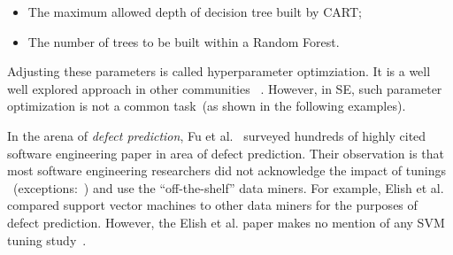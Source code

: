 \documentclass[sigconf,review, anonymous]{acmart}
\theoremstyle{break}
\newcommand{\bi}{\begin{itemize}[leftmargin=0.4cm]}
\newcommand{\ei}{\end{itemize}}
\begin{document}
\begin{table}[htp]
   \caption {List of Parameters Tuned by This Paper.}
\centering
{}
\label{tab:parameters}
\end{table}


\bi
\item
The maximum allowed depth
of decision tree built by CART;
\item
The number of trees to be built within a Random Forest.
\ei



Adjusting these parameters
is called hyperparameter optimziation.
It is a well   well explored approach in other communities ~\cite{bergstra2012random,li2016hyperband}. However, in SE,
such parameter optimization is not a common task~(as shown in the following examples).





In the arena of {\em defect prediction}, 
Fu et al.~\cite{fu2016tuning}  surveyed hundreds of highly 
cited software engineering paper in area of defect prediction. 
Their observation is that most software engineering  researchers
did not acknowledge the impact of tunings 
~(exceptions:~\cite{lessmann2008benchmarking,tantithamthavorn2016automated}) and
use the ``off-the-shelf'' data miners. For example, 
Elish et al.~\cite{elish2008predicting} compared support vector machines
to other data miners for the purposes of defect prediction.
However, the Elish et al. paper makes no mention of any SVM tuning study~\cite{elish2008predicting}.
\end{document}
